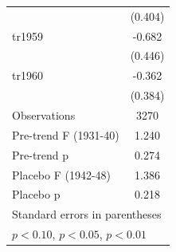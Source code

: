 \begin{table}[htbp]
\begin{tabular}{l*{1}{c}}
                    &     (0.404)         \\
\addlinespace
tr1959              &      -0.682         \\
                    &     (0.446)         \\
\addlinespace
tr1960              &      -0.362         \\
                    &     (0.384)         \\
\midrule
Observations        &        3270         \\
Pre-trend F (1931-40)&       1.240         \\
Pre-trend p         &       0.274         \\
Placebo F (1942-48) &       1.386         \\
Placebo p           &       0.218         \\
\bottomrule
\multicolumn{2}{l}{\footnotesize Standard errors in parentheses}\\
\multicolumn{2}{l}{\footnotesize \sym{*} \(p<0.10\), \sym{**} \(p<0.05\), \sym{***} \(p<0.01\)}\\
\end{tabular}
\end{table}
